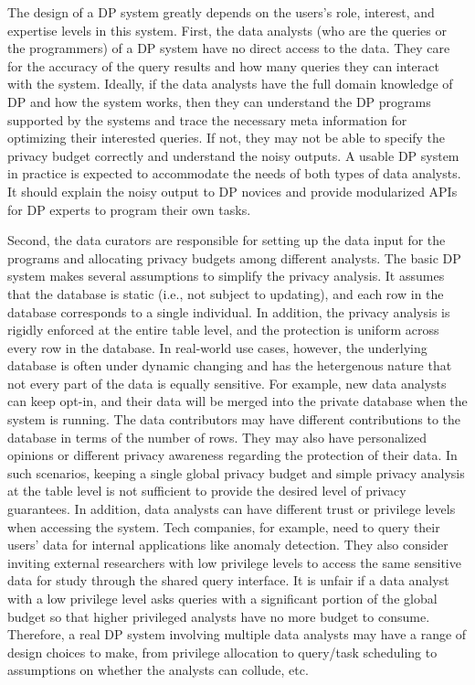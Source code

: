 The design of a DP system greatly depends on the users's role, interest, and expertise levels in this system. First, the data analysts (who are the queries or the programmers) of a DP system have no direct access to the data. They care for the accuracy of the query results and how many queries they can interact with the system. Ideally, if the data analysts have the full domain knowledge of DP and how the system works, then they can understand the DP programs supported by the systems and trace the necessary meta information for optimizing their interested queries. If not, they may not be able to specify the privacy budget correctly and understand the noisy outputs.
A usable DP system in practice is expected to accommodate the needs of both types of data analysts. 
It should explain the noisy output to DP novices and provide modularized APIs for DP experts to program their own tasks.

Second, the data curators are responsible for setting up the data input for the programs and allocating privacy budgets among different analysts.
The basic DP system makes several assumptions to simplify the privacy analysis.
It assumes that the database is static (i.e., not subject to updating), and each row in the database corresponds to a single individual.
In addition, the privacy analysis is rigidly enforced at the entire table level, and the protection is uniform across every row in the database.
In real-world use cases, however, the underlying database is often under dynamic changing and has the hetergenous nature that not every part of the data is equally sensitive.
For example, new data analysts can keep opt-in, and their data will be merged into the private database when the system is running.
The data contributors may have different contributions to the database in terms of the number of rows.
They may also have personalized opinions or different privacy awareness regarding the protection of their data.
In such scenarios, keeping a single global privacy budget and simple privacy analysis at the table level is not sufficient to provide the desired level of privacy guarantees.
In addition, data analysts can have different trust or privilege levels when accessing the system. Tech companies, for example, need to query their users’ data for internal applications like anomaly detection. 
They also consider inviting external researchers with low privilege levels to access the same sensitive data for study through the shared query interface.
It is unfair if a data analyst with a low privilege level asks queries with a significant portion of the global budget so that higher privileged analysts have no more budget to consume.
Therefore, a real DP system involving multiple data analysts may have a range of design choices to make, from privilege allocation to query/task scheduling to assumptions on whether the analysts can collude, etc.

